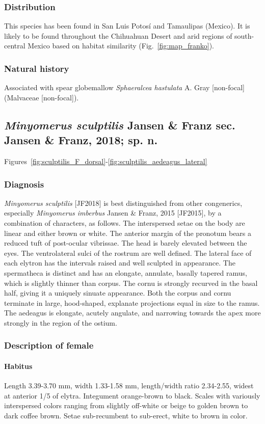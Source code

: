 \documentclass[fleqn,10pt,lineno]{wlpeerj} %
\begin{document}
		\subsubsection*{Distribution}
			This species has been found in San Luis Potos\'{i} and Tamaulipas (Mexico).
			It is likely to be found throughout the Chihuahuan Desert and arid regions of south-central Mexico based on habitat similarity (Fig.~\ref{fig:map_franko}).
		\subsubsection*{Natural history}
			Associated with spear globemallow \textit{Sphaeralcea hastulata} A. Gray [non-focal] (Malvaceae [non-focal]).

	\subsection*{\textit{Minyomerus sculptilis} Jansen \& Franz sec. Jansen \& Franz, 2018; sp. n.}\label{ssec:sculpt}
		Figures~\ref{fig:sculptilis_F_dorsal}-\ref{fig:sculptilis_aedeagus_lateral}
		\subsubsection*{Diagnosis}
			\textit{Minyomerus sculptilis} [JF2018] is best distinguished from other congenerics, especially \textit{Minyomerus imberbus} Jansen \& Franz, 2015 [JF2015], by a combination of characters, as follows.
			The interspersed setae on the body are linear and either brown or white.
			The anterior margin of the pronotum bears a reduced tuft of post-ocular vibrissae.
			The head is barely elevated between the eyes.
			The ventrolateral sulci of  the rostrum are well defined.
			The lateral face of each elytron has the intervals raised and well sculpted in appearance.
			The spermatheca is distinct and has an elongate, annulate, basally tapered ramus, which is slightly thinner than corpus.
			The cornu is strongly recurved in the basal half, giving it a uniquely sinuate appearance.
			Both the corpus and cornu terminate in large, hood-shaped, explanate projections equal in size to the ramus.
			The aedeagus is elongate, acutely angulate, and narrowing towards the apex more strongly in the region of the ostium.
		\subsubsection*{Description of female}
			\paragraph{Habitus}
				Length 3.39-3.70 mm, width 1.33-1.58 mm, length/width ratio 2.34-2.55, widest at anterior 1/5 of elytra.
				Integument orange-brown to black.
				Scales with variously interspersed colors ranging from slightly off-white or beige to golden brown to dark coffee brown.
				Setae sub-recumbent to sub-erect, white to brown in color.
\end{document}
